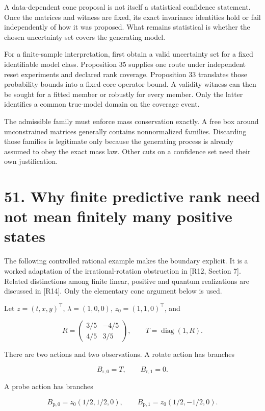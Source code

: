 \documentclass[11pt,letterpaper]{article}
\begin{document}
A data-dependent cone proposal is not itself a statistical confidence
statement. Once the matrices and witness are fixed, its exact invariance
identities hold or fail independently of how it was proposed. What
remains statistical is whether the chosen uncertainty set covers the
generating model.

For a finite-sample interpretation, first obtain a valid uncertainty set
for a fixed identifiable model class. Proposition 35 supplies one route
under independent reset experiments and declared rank coverage.
Proposition 33 translates those probability bounds into a fixed-core
operator bound. A validity witness can then be sought for a fitted
member or robustly for every member. Only the latter identifies a common
true-model domain on the coverage event.

The admissible family must enforce mass conservation exactly. A free box
around unconstrained matrices generally contains nonnormalized families.
Discarding those families is legitimate only because the generating
process is already assumed to obey the exact mass law. Other cuts on a
confidence set need their own justification.

\section{51. Why finite predictive rank need not mean finitely many
positive
states}\label{why-finite-predictive-rank-need-not-mean-finitely-many-positive-states}

The following controlled rational example makes the boundary explicit.
It is a worked adaptation of the irrational-rotation obstruction in
{[}R12, Section 7{]}. Related distinctions among finite linear, positive
and quantum realizations are discussed in {[}R14{]}. Only the elementary
cone argument below is used.

Let \(z=(t,x,y)^\top\), \(\lambda=(1,0,0)\), \(z_0=(1,1,0)^\top\), and

\[
R=\begin{pmatrix}3/5&-4/5\\4/5&3/5\end{pmatrix},
\qquad T=\operatorname{diag}(1,R).
\]

There are two actions and two observations. A rotate action has branches

\[
B_{\mathrm r,0}=T,\qquad B_{\mathrm r,1}=0.
\]

A probe action has branches

\[
B_{\mathrm p,0}=z_0(1/2,1/2,0),\qquad
B_{\mathrm p,1}=z_0(1/2,-1/2,0).
\]
\end{document}
